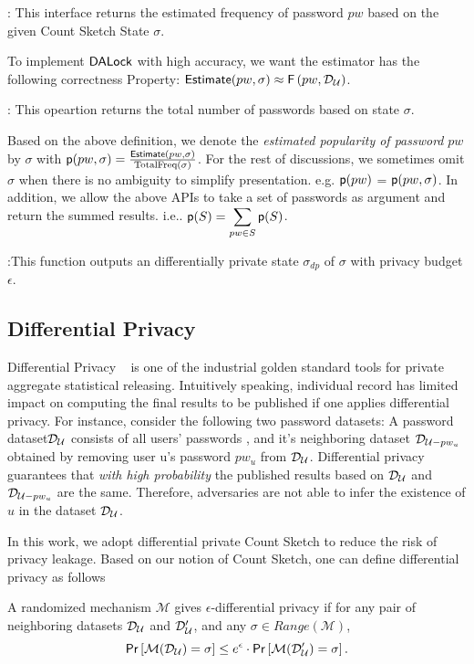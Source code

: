 : This interface returns the estimated frequency of password $pw$ based on the given Count Sketch State $\sigma$.

To implement $\mathsf{DALock}$ with high accuracy, we want the estimator has the following correctness Property: $\textsf{Estimate}(pw,\sigma) \approx \mathsf{F}\left(pw, \mathcal{D}_{{\mathcal{U}}} \right)$. 

: This opeartion returns the total number of passwords based on state $\sigma$.

Based on the above definition, we denote the \emph{estimated popularity of password} $pw$ by $\sigma$ with $\textsf{p}(pw,\sigma) = \frac{\textsf{Estimate}(pw,\sigma)}{\text{TotalFreq}(\sigma)}$. For the rest of discussions, we sometimes omit $\sigma$ when there is no ambiguity to simplify presentation. e.g. $\textsf{p}(pw)$ = $\textsf{p}(pw,\sigma)$. In addition, we allow the above APIs to take a set of passwords as argument and return the summed results. i.e.. $\textsf{p}(S) = \displaystyle{\sum_{pw \in S} \textsf{p}(S)}$. 

:This function outputs an differentially private state $\sigma_{dp}$ of $\sigma$ with privacy budget $\epsilon$.


\subsection{Differential Privacy} \label{section:Prelinmaries-DiffernetialPrivacy} %
Differential Privacy ~\cite{ECS:Dwork11} is one of the industrial golden standard tools for private aggregate statistical releasing. Intuitively speaking, individual record has limited impact on computing the final results to be published if one applies differential privacy. For instance, consider the following two password datasets: A password dataset$\mathcal{D}_{{\mathcal{U}}}$ consists of all users' passwords , and it's neighboring dataset $\mathcal{D}_{{\mathcal{U} - pw_u}}$ obtained by removing user u's password $pw_u$ from $\mathcal{D}_{{\mathcal{U}}}$. Differential privacy guarantees that \emph{with high probability} the published results based on $\mathcal{D}_{{\mathcal{U}}}$ and $\mathcal{D}_{{\mathcal{U} - pw_{u}}}$ are the same. Therefore, adversaries are not able to infer the existence of $u$ in the dataset $\mathcal{D}_{{\mathcal{U}}}$.

In this work, we adopt differential private Count Sketch to reduce the risk of privacy leakage. Based on our notion of Count Sketch, one can define differential privacy as follows
\begin{definition} \label{def:diff}
	A randomized mechanism $\mathcal{M}$ gives $\epsilon$-differential privacy if for any pair of neighboring datasets $\mathcal{D}_{{\mathcal{U}}}$ and $\mathcal{D}_{{\mathcal{U}}}'$, and any $\sigma \in \mathit{Range}(\mathcal{M})$,
	$$\mathsf{Pr} \left[\mathcal{M}(\mathcal{D}_{{\mathcal{U}}})=\sigma\right]  \leq e^{\epsilon}\cdot \mathsf{Pr} \left[\mathcal{M}(\mathcal{D}_{{\mathcal{U}}}')=\sigma\right] .$$
\end{definition}

